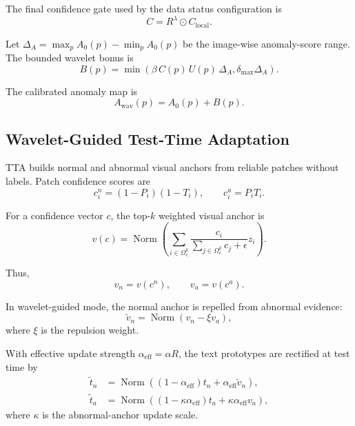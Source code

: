 The final confidence gate used by the data status configuration is
\begin{equation}
  C = R^{\lambda} \odot C_{\mathrm{local}}.
\end{equation}

Let $\Delta_A=\max_p A_0(p)-\min_p A_0(p)$ be the image-wise anomaly-score
range. The bounded wavelet bonus is
\begin{equation}
  B(p)
  =
  \min
  \left(
    \beta\, C(p)\, U(p)\,\Delta_A,
    \delta_{\max}\Delta_A
  \right).
\end{equation}

The calibrated anomaly map is
\begin{equation}
  A_{\mathrm{wav}}(p) = A_0(p) + B(p).
\end{equation}

\subsection{Wavelet-Guided Test-Time Adaptation}
\label{subsec:formula_tta}

TTA builds normal and abnormal visual anchors from reliable patches without
labels. Patch confidence scores are
\begin{equation}
  c_i^n = (1-P_i)(1-T_i),
  \qquad
  c_i^a = P_iT_i .
\end{equation}

For a confidence vector $c$, the top-$k$ weighted visual anchor is
\begin{equation}
  v(c)
  =
  \operatorname{Norm}
  \left(
    \sum_{i\in\Omega_c^k}
    \frac{c_i}{\sum_{j\in\Omega_c^k} c_j+\epsilon}
    z_i
  \right).
\end{equation}

Thus,
\begin{equation}
  v_n = v(c^n),
  \qquad
  v_a = v(c^a).
\end{equation}

In wavelet-guided mode, the normal anchor is repelled from abnormal evidence:
\begin{equation}
  \tilde{v}_n
  =
  \operatorname{Norm}(v_n-\xi v_a),
\end{equation}
where $\xi$ is the repulsion weight.

With effective update strength $\alpha_{\mathrm{eff}}=\alpha R$, the text
prototypes are rectified at test time by
\begin{align}
  \tilde{t}_n
  &=
  \operatorname{Norm}
  \left(
    (1-\alpha_{\mathrm{eff}})t_n
    +
    \alpha_{\mathrm{eff}}\tilde{v}_n
  \right), \\
  \tilde{t}_a
  &=
  \operatorname{Norm}
  \left(
    (1-\kappa\alpha_{\mathrm{eff}})t_a
    +
    \kappa\alpha_{\mathrm{eff}}v_a
  \right),
\end{align}
where $\kappa$ is the abnormal-anchor update scale.

